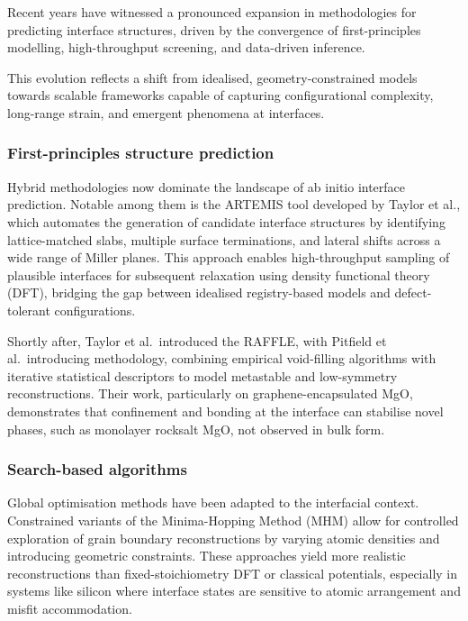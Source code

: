 Recent years have witnessed a pronounced expansion in methodologies for predicting interface structures, driven by the
convergence of first-principles modelling, high-throughput screening, and data-driven inference.

This evolution reflects a shift from idealised, geometry-constrained models towards scalable frameworks capable of
capturing configurational complexity, long-range strain, and emergent phenomena at interfaces.

\subsubsection{First-principles structure prediction}

Hybrid methodologies now dominate the landscape of ab initio interface prediction. Notable among them is the
\textsc{ARTEMIS} tool developed by Taylor et al., which automates the generation of candidate interface structures by
identifying lattice-matched slabs, multiple surface terminations, and lateral shifts across a wide range of Miller
planes. This approach enables high-throughput sampling of plausible interfaces for subsequent relaxation using density
functional theory (DFT), bridging the gap between idealised registry-based models and defect-tolerant configurations.

Shortly after, Taylor et al.\ introduced the \textsc{RAFFLE}, with Pitfield et al.\ introducing methodology, combining
empirical void-filling algorithms with iterative statistical descriptors to model metastable and low-symmetry
reconstructions. Their work, particularly on graphene-encapsulated MgO, demonstrates that confinement and bonding at
the interface can stabilise novel phases, such as monolayer rocksalt MgO, not observed in bulk form.

\subsubsection{Search-based algorithms}

Global optimisation methods have been adapted to the interfacial context. Constrained variants of the Minima-Hopping
Method (MHM) allow for controlled exploration of grain boundary reconstructions by varying atomic densities and
introducing geometric constraints. These approaches yield more realistic reconstructions than fixed-stoichiometry DFT
or classical potentials, especially in systems like silicon where interface states are sensitive to atomic arrangement
and misfit accommodation.

